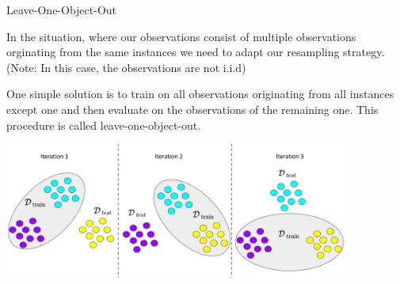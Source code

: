 \documentclass[11pt,compress,t,notes=noshow, xcolor=table]{beamer}
\newenvironment{knitrout}{}{} %
\begin{document}
\begin{vbframe}{Leave-One-Object-Out}

In the situation, where our observations consist of  multiple observations 
orginating from the same instances we need to adapt our resampling strategy. 
(Note: In this case, the observations are not i.i.d)

\lz

One simple solution is to train on all observations originating from all instances
except one and then evaluate on the observations of the remaining one. This
procedure is called leave-one-object-out.
\lz

\begin{knitrout}\scriptsize
{}\color{fgcolor}

{\centering \includegraphics[width=0.85\textwidth]{figure_man/loobject} 

}

\end{knitrout}
\end{vbframe}
\endlecture
\end{document}
